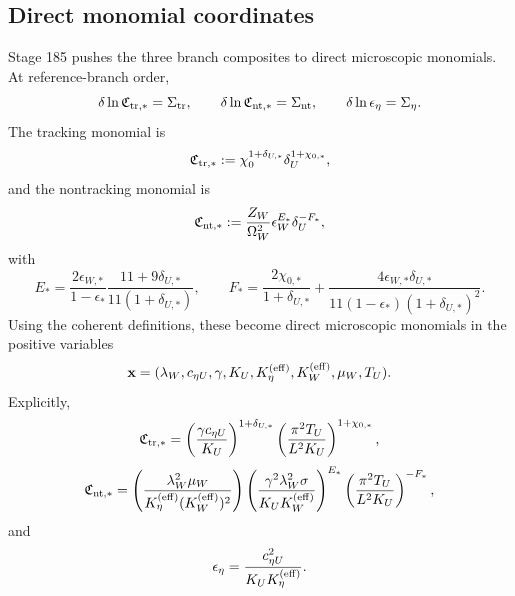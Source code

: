 \subsection{Direct monomial coordinates}
Stage 185 pushes the three branch composites to direct microscopic monomials.  At reference-branch order,
\begin{equation}
\label{eq:part05-monomial-drift-laws}
\delta\ln\mathfrak C_{{\rm tr},*}=\Sigma_{\rm tr},
\qquad
\delta\ln\mathfrak C_{{\rm nt},*}=\Sigma_{\rm nt},
\qquad
\delta\ln\epsilon_\eta=\Sigma_\eta.
\end{equation}
The tracking monomial is
\begin{equation}
\label{eq:part05-Ctr-monomial-simple}
\mathfrak C_{{\rm tr},*}
:=
\chi_0^{1+\delta_{U,*}}\delta_U^{1+\chi_{0,*}},
\end{equation}
and the nontracking monomial is
\begin{equation}
\label{eq:part05-Cnt-monomial-simple}
\mathfrak C_{{\rm nt},*}
:=
\frac{Z_W}{\Omega_W^2}\epsilon_W^{E_*}\delta_U^{-F_*},
\end{equation}
with
\begin{equation}
\label{eq:part05-EF-defs}
E_*=
\frac{2\epsilon_{W,*}}{1-\epsilon_*}\frac{11+9\delta_{U,*}}{11(1+\delta_{U,*})},
\qquad
F_*=
\frac{2\chi_{0,*}}{1+\delta_{U,*}}
+
\frac{4\epsilon_{W,*}\delta_{U,*}}{11(1-\epsilon_*)(1+\delta_{U,*})^2}.
\end{equation}
Using the coherent definitions, these become direct microscopic monomials in the positive variables
\begin{equation}
\label{eq:part05-micro-state-vector}
\mathbf x
=
(\lambda_W,
 c_{\eta U},
 \gamma,
 K_U,
 K_\eta^{({\rm eff})},
 K_W^{({\rm eff})},
 \mu_W,
 T_U).
\end{equation}
Explicitly,
\begin{equation}
\label{eq:part05-Ctr-micro}
\mathfrak C_{{\rm tr},*}
=
\left(\frac{\gamma c_{\eta U}}{K_U}\right)^{1+\delta_{U,*}}
\left(\frac{\pi^2T_U}{L^2K_U}\right)^{1+\chi_{0,*}},
\end{equation}
\begin{equation}
\label{eq:part05-Cnt-micro}
\mathfrak C_{{\rm nt},*}
=
\left(\frac{\lambda_W^2\mu_W}{K_\eta^{({\rm eff})}(K_W^{({\rm eff})})^2}\right)
\left(\frac{\gamma^2\lambda_W^2\sigma}{K_UK_W^{({\rm eff})}}\right)^{E_*}
\left(\frac{\pi^2T_U}{L^2K_U}\right)^{-F_*},
\end{equation}
and
\begin{equation}
\label{eq:part05-epsilon-eta-monomial}
\epsilon_\eta=\frac{c_{\eta U}^2}{K_UK_\eta^{({\rm eff})}}.
\end{equation}


